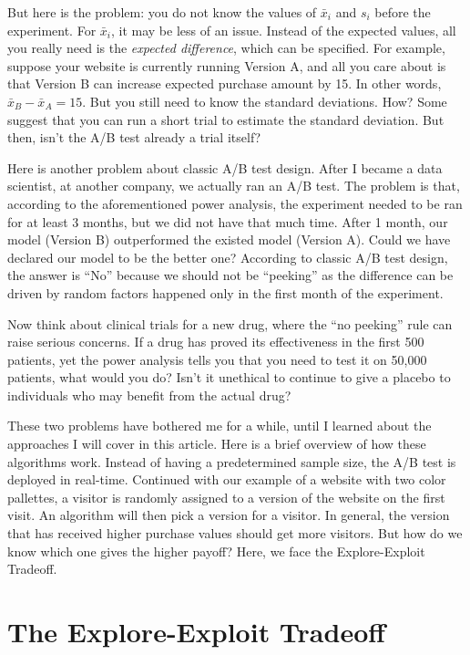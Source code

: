 \documentclass[
]{book}
\theoremstyle{definition}
\theoremstyle{definition}
\theoremstyle{definition}
\theoremstyle{definition}
\theoremstyle{remark}
\begin{document}
But here is the problem: you do not know the values of \(\bar{x}_i\) and \(s_i\) before the experiment. For \(\bar{x}_i\), it may be less of an issue. Instead of the expected values, all you really need is the \emph{expected difference}, which can be specified. For example, suppose your website is currently running Version A, and all you care about is that Version B can increase expected purchase amount by 15. In other words, \(\bar{x}_B-\bar{x}_A=15\). But you still need to know the standard deviations. How? Some suggest that you can run a short trial to estimate the standard deviation. But then, isn't the A/B test already a trial itself?

Here is another problem about classic A/B test design. After I became a data scientist, at another company, we actually ran an A/B test. The problem is that, according to the aforementioned power analysis, the experiment needed to be ran for at least 3 months, but we did not have that much time. After 1 month, our model (Version B) outperformed the existed model (Version A). Could we have declared our model to be the better one? According to classic A/B test design, the answer is ``No'' because we should not be ``peeking'' as the difference can be driven by random factors happened only in the first month of the experiment.

Now think about clinical trials for a new drug, where the ``no peeking'' rule can raise serious concerns. If a drug has proved its effectiveness in the first 500 patients, yet the power analysis tells you that you need to test it on 50,000 patients, what would you do? Isn't it unethical to continue to give a placebo to individuals who may benefit from the actual drug?

These two problems have bothered me for a while, until I learned about the approaches I will cover in this article. Here is a brief overview of how these algorithms work. Instead of having a predetermined sample size, the A/B test is deployed in real-time. Continued with our example of a website with two color pallettes, a visitor is randomly assigned to a version of the website on the first visit. An algorithm will then pick a version for a visitor. In general, the version that has received higher purchase values should get more visitors. But how do we know which one gives the higher payoff? Here, we face the Explore-Exploit Tradeoff.

\hypertarget{the-explore-exploit-tradeoff}{%
\section{The Explore-Exploit Tradeoff}\label{the-explore-exploit-tradeoff}}
\end{document}
